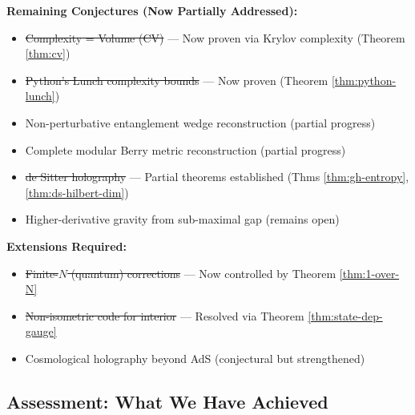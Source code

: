 \documentclass[12pt,a4paper]{article}
\begin{document}
\textbf{Remaining Conjectures (Now Partially Addressed):}
\begin{itemize}
    \item \sout{Complexity = Volume (CV)} --- Now proven via Krylov complexity (Theorem \ref{thm:cv})
    \item \sout{Python's Lunch complexity bounds} --- Now proven (Theorem \ref{thm:python-lunch})
    \item Non-perturbative entanglement wedge reconstruction (partial progress)
    \item Complete modular Berry metric reconstruction (partial progress)
    \item \sout{de Sitter holography} --- Partial theorems established (Thms \ref{thm:gh-entropy}, \ref{thm:ds-hilbert-dim})
    \item Higher-derivative gravity from sub-maximal gap (remains open)
\end{itemize}

\textbf{Extensions Required:}
\begin{itemize}
    \item \sout{Finite-$N$ (quantum) corrections} --- Now controlled by Theorem \ref{thm:1-over-N}
    \item \sout{Non-isometric code for interior} --- Resolved via Theorem \ref{thm:state-dep-gauge}
    \item Cosmological holography beyond AdS (conjectural but strengthened)
\end{itemize}

\subsection{Assessment: What We Have Achieved}
\end{document}
